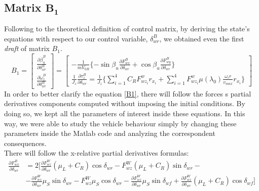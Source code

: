 \subsection{Matrix $\mathbf{B_{1}}$} 
	Following to the theoretical definition of control matrix, by deriving the state's equations with respect to our control variable, $\delta_{wr}^{B}$, we obtained even the first \textit{draft} of matrix $B_{1}$.
		\begin{equation} \label{B1}
			B_{1}=
			\begin{bmatrix} 
				\frac{\partial\dot{\beta}_{u}^{B}}{\partial\delta_{wr}^{B}} \\
				\frac{\partial\dot{\omega}_{z}^{B}}{\partial\delta_{wr}^{B}}
			\end{bmatrix} = 
			\begin{bmatrix}
				-\frac{1}{mV_{0B}}\{-\sin\beta_{u}\frac{\partial F_{wx}^{B}}{\partial \delta_{wr}} + \cos\beta_{u}\frac{\partial F_{wy}^{B}}{\partial \delta_{wr}}\}  \\
				\frac{1}{J_{z}} \frac{\partial \tau_{z}^{B}}{\partial\delta_{wr}} = \frac{1}{J_{z}} \{ \sum\limits_{i=1}^4 C_{R}F_{wz_{i}}^{w} r_{x_{i}} + \sum\limits_{i=1}^4 F_{wz_{i}}^{w} \mu(\lambda_{0}) \frac{\omega_{i} r}{v_{max}}r_{x_{i}} \}
			\end{bmatrix}
		\end{equation} 
	In order to better clarify the equation \ref{B1}, there will follow the forces s partial derivatives components computed without imposing the initial conditions. By doing so, we kept all the parameters of interest inside these equations. In this way, we were able to study the vehicle behaviour simply by changing these parameters inside the Matlab code and analyzing the correspondent consequences. \\ There will follow the x-relative partial derivatives formulas: 
		\begin{equation} \label{Fwx su deltaR }
			\begin{split}
				\frac{\partial F_{wx}^{B}}{\partial \delta_{wr}} &= 2 [\frac{\partial F_{wz}^{W}}{\partial \delta_{wr}} (\mu_{L}+C_{R}) \cos\delta_{wr} - F_{wz}^{W} (\mu_{L}+C_{R})\sin\delta_{wr} - \\
				&- \frac{\partial F_{wz}^{W}}{\partial \delta_{wr}} \mu_{S} \sin \delta_{wr} - F_{wz}^{W} \mu_{S}\cos\delta_{wr} - \frac{\partial F_{wz}^{W}}{\partial \delta_{wr}} \mu_{S} \sin \delta_{wf} + \frac{\partial F_{wz}^{W}}{\partial \delta_{wr}} (\mu_{L}+C_{R}) \cos\delta_{wf}]
			\end{split}
		\end{equation}
